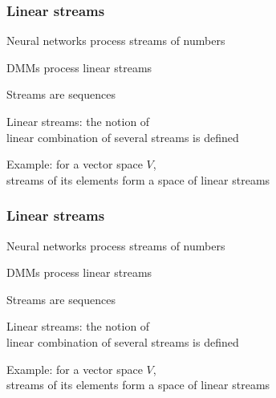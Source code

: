 \documentclass{beamer}
\newcommand{\msgray}[1]{{\color{mygray} #1}}
\begin{document}
\begin{frame}

\frametitle{Linear streams}

\begin{itemize}

\item Neural networks process streams of numbers\\[2ex]

\msgray{\item DMMs process linear streams\\[2ex]

\item Streams are sequences\\[2ex]

\item Linear streams: the notion of\\ linear combination of several streams is defined\\[2ex]

\item Example: for a vector space $V$,\\ streams of its elements form a space of linear streams\\[2ex]


}

\end{itemize}

\end{frame}

\begin{frame}

\frametitle{Linear streams}

\begin{itemize}

\item Neural networks process streams of numbers\\[2ex]

\item DMMs process linear streams\\[2ex]

\msgray{\item Streams are sequences\\[2ex]

\item Linear streams: the notion of\\ linear combination of several streams is defined\\[2ex]

\item Example: for a vector space $V$,\\ streams of its elements form a space of linear streams\\[2ex]


}

\end{itemize}

\end{frame}
\end{document}
